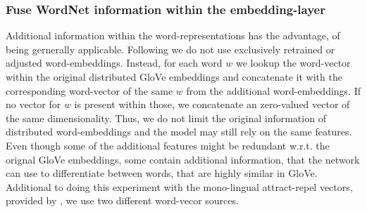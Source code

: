 \subsubsection{Fuse WordNet information within the embedding-layer}
Additional information within the word-representations has the advantage, of being gernerally applicable. Following \cite{ruckle2018concatenated} we do not use exclusively retrained or adjusted word-embeddings. Instead, for each word $w$ we lookup the word-vector within the original distributed GloVe embeddings and concatenate it with the corresponding word-vector of the same $w$ from the additional word-embeddings. If no vector for $w$ is present within those, we concatenate an zero-valued vector of the same dimensionality. Thus, we do not limit the original information of distributed word-embeddings and the model may still rely on the same features. Even though some of the additional features might be redundant w.r.t. the orignal GloVe embeddings, some contain additional information, that the network can use to differentiate between words, that are highly similar in GloVe. Additional to doing this experiment with the mono-lingual attract-repel vectors, provided by \cite{ruckle2018concatenated}, we use two different word-vecor sources.


